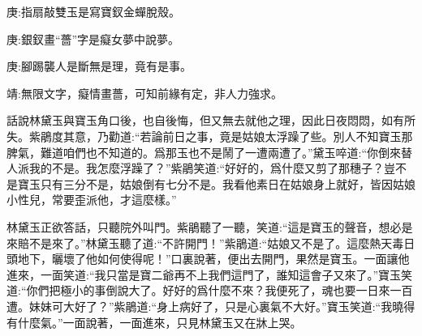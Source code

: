 

\begin{parag}
    \begin{note}庚:指扇敲雙玉是寫寶釵金蟬脫殼。\end{note}
\end{parag}


\begin{parag}
    \begin{note}庚:銀釵畫“薔”字是癡女夢中說夢。\end{note}
\end{parag}


\begin{parag}
    \begin{note}庚:腳踢襲人是斷無是理，竟有是事。\end{note}
\end{parag}


\begin{parag}
    \begin{note}靖:無限文字，癡情畫薔，可知前緣有定，非人力強求。\end{note}
\end{parag}


\begin{parag}
    話說林黛玉與寶玉角口後，也自後悔，但又無去就他之理，因此日夜悶悶，如有所失。紫鵑度其意，乃勸道:“若論前日之事，竟是姑娘太浮躁了些。別人不知寶玉那脾氣，難道咱們也不知道的。爲那玉也不是鬧了一遭兩遭了。”黛玉啐道:“你倒來替人派我的不是。我怎麼浮躁了？”紫鵑笑道:“好好的，爲什麼又剪了那穗子？豈不是寶玉只有三分不是，姑娘倒有七分不是。我看他素日在姑娘身上就好，皆因姑娘小性兒，常要歪派他，才這麼樣。”
\end{parag}


\begin{parag}
    林黛玉正欲答話，只聽院外叫門。紫鵑聽了一聽，笑道:“這是寶玉的聲音，想必是來賠不是來了。”林黛玉聽了道:“不許開門！”紫鵑道:“姑娘又不是了。這麼熱天毒日頭地下，曬壞了他如何使得呢！”口裏說著，便出去開門，果然是寶玉。一面讓他進來，一面笑道:“我只當是寶二爺再不上我們這門了，誰知這會子又來了。”寶玉笑道:“你們把極小的事倒說大了。好好的爲什麼不來？我便死了，魂也要一日來一百遭。妹妹可大好了？”紫鵑道:“身上病好了，只是心裏氣不大好。”寶玉笑道:“我曉得有什麼氣。”一面說著，一面進來，只見林黛玉又在牀上哭。
\end{parag}


